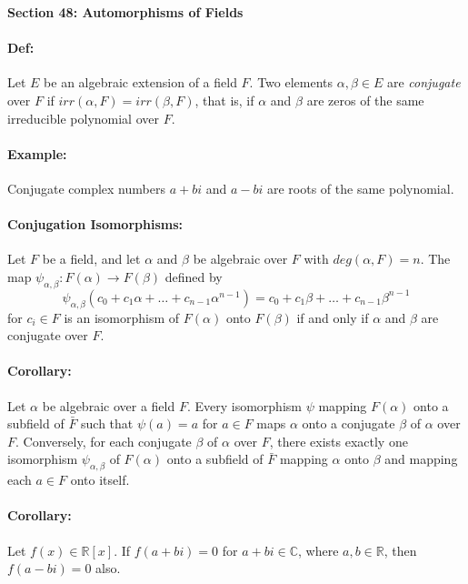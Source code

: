 \documentclass[10pt,a4paper]{article}
\begin{document}
\begin{center}
\textbf{Section 48: Automorphisms of Fields}
\end{center}

\paragraph{Def:} Let $E$ be an algebraic extension of a field $F$. Two elements $\alpha,\beta \in E$ are \textit{conjugate} over $F$ if $irr(\alpha, F) = irr(\beta, F)$, that is, if $\alpha$ and $\beta$ are zeros of the same irreducible polynomial over $F$.

\paragraph{Example:} Conjugate complex numbers $a+bi$ and $a-bi$ are roots of the same polynomial.

\paragraph{Conjugation Isomorphisms:} Let $F$ be a field, and let $\alpha$ and $\beta$ be algebraic over $F$ with $deg(\alpha, F) = n$. The map $\psi_{\alpha,\beta}: F(\alpha) \to F(\beta)$ defined by
$$ \psi_{\alpha, \beta}(c_0+c_1\alpha+\dots+c_{n-1}\alpha^{n-1}) = c_0 + c_1\beta+\dots+c_{n-1}\beta^{n-1}$$
for $c_i \in F$ is an isomorphism of $F(\alpha)$ onto $F(\beta)$ if and only if $\alpha$ and $\beta$ are conjugate over $F$.

\paragraph{Corollary:} Let $\alpha$ be algebraic over a field $F$. Every isomorphism $\psi$ mapping $F(\alpha)$ onto a subfield of $\bar{F}$ such that $\psi(a) = a$ for $a \in F$ maps $\alpha$ onto a conjugate $\beta$ of $\alpha$ over $F$. Conversely, for each conjugate $\beta$ of $\alpha$ over $F$, there exists exactly one isomorphism $\psi_{\alpha, \beta}$ of $F(\alpha)$ onto a subfield of $\bar{F}$ mapping $\alpha$ onto $\beta$ and mapping each $a \in F$ onto itself.

\paragraph{Corollary:} Let $f(x) \in \mathbb{R}[x]$. If $f(a+bi)=0$ for $a+bi \in \mathbb{C}$, where $a,b \in \mathbb{R}$, then $f(a-bi) = 0$ also. 
\end{document}
